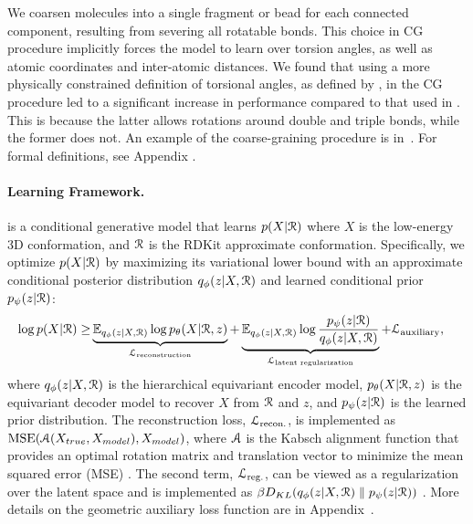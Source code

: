We coarsen molecules into a single fragment or bead for each connected component, resulting from severing all rotatable bonds.
This choice in CG procedure implicitly forces the model to learn over torsion angles, as well as atomic coordinates and inter-atomic distances.
We found that using a more physically constrained definition of torsional angles, as defined by \citet{GeoMol}, in the CG procedure led to a significant increase in performance compared to that used in \citet{torsional-diffusion}. This is because the latter allows rotations around double and triple bonds, while the former does not. 
An example of the coarse-graining procedure is in~. For formal definitions, see Appendix .

\paragraph{Learning Framework.} \model is a conditional generative model that learns $p(X | {\mathcal{R}})$ where $X$ is the low-energy 3D conformation, and ${\mathcal{R}}$ is the RDKit approximate conformation. Specifically, we optimize $p(X | {\mathcal{R}})$ by maximizing its variational lower bound with an approximate conditional posterior distribution $q_\phi(z |X, {\mathcal{R}})$ and learned conditional prior $p_\psi(z | {\mathcal{R}})$:
\begin{equation}
\begin{aligned}
    \log p(X|\gR) \geq & \underbrace{\E_{q_\phi(z | X, \gR)} \log p_\theta(X | \gR, z)}_{\gL_{\text{reconstruction}}} + \underbrace{\E_{q_\phi(z | X, \gR)} \log \frac{ p_\psi(z|\gR) }{q_\phi(z| X, \gR)}}_{\gL_{\text{latent regularization}}}  + \gL_{\text{auxiliary}}, %
\label{eq:elbo}
\end{aligned}
\end{equation}
where $q_\phi(z|X,{\mathcal{R}})$ is the hierarchical equivariant encoder model, $p_\theta(X|{\mathcal{R}},z)$ is the equivariant decoder model to recover $X$ from ${\mathcal{R}}$ and $z$, and $p_\psi(z|{\mathcal{R}})$ is the learned prior distribution. The reconstruction loss, ${\mathcal{L}}_{\text{recon.}}$, is implemented as $\text{MSE}({\mathcal{A}}(X_{true}, X_{model}), X_{model})$, where ${\mathcal{A}}$ is the Kabsch alignment function that provides an optimal rotation matrix and translation vector to minimize the mean squared error (MSE) \citep{Kabsch}. The second term, ${\mathcal{L}}_{\text{reg.}}$, can be viewed as a regularization over the latent space and is implemented as $\beta D_{KL}(q_\phi(z | X, {\mathcal{R}})\parallel p_\psi(z|{\mathcal{R}}))$ \citep{beta-vae}. 
More details on the geometric auxiliary loss function are in Appendix~.

